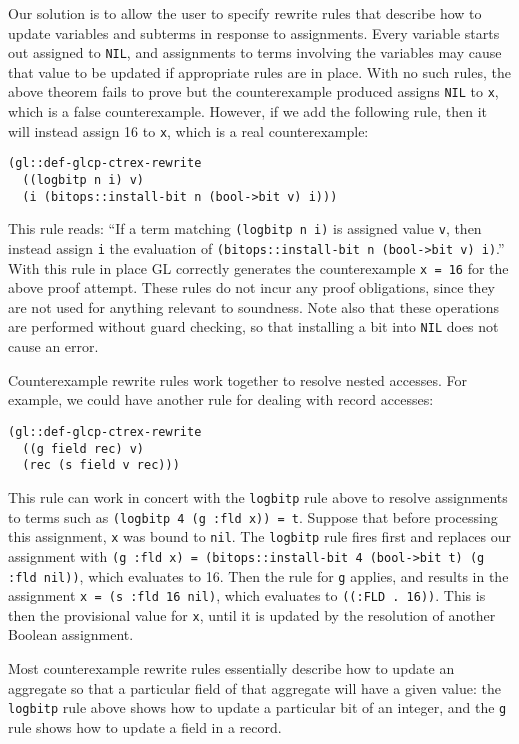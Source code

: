 \documentclass[submission,copyright,creativecommons]{eptcs}
\begin{document}
Our solution is to allow the user to specify rewrite rules that
describe how to update variables and subterms in response to
assignments.  Every variable starts out assigned to \texttt{NIL}, and
assignments to terms involving the variables may cause that value to
be updated if appropriate rules are in place.  With no such rules, the
above theorem fails to prove but the counterexample produced assigns
\texttt{NIL} to \texttt{x}, which is a false counterexample.  However,
if we add the following rule, then it will instead assign 16 to
\texttt{x}, which is a real counterexample:
\begin{verbatim}
(gl::def-glcp-ctrex-rewrite
  ((logbitp n i) v)
  (i (bitops::install-bit n (bool->bit v) i)))
\end{verbatim}
This rule reads: ``If a term matching \texttt{(logbitp n i)} is
assigned value \texttt{v}, then instead assign \texttt{i} the
evaluation of \texttt{(bitops::install-bit n (bool->bit v) i)}.''  With
this rule in place GL correctly generates the counterexample \texttt{x
  = 16} for the above proof attempt.  These rules do not incur any
proof obligations, since they are not used for anything relevant to
soundness.  Note also that these operations are performed without 
guard checking, so that installing a bit into \texttt{NIL} does not 
cause an error.

Counterexample rewrite rules work together to resolve nested accesses.
For example, we could have another rule for dealing with record accesses:
\begin{verbatim}
(gl::def-glcp-ctrex-rewrite
  ((g field rec) v)
  (rec (s field v rec)))
\end{verbatim}
\noindent This rule can work in concert with the \texttt{logbitp} rule
above to resolve assignments to terms such as \texttt{(logbitp 4 (g
  :fld x)) = t}.  Suppose that before processing this assignment, \texttt{x} was bound to \texttt{nil}.
The \texttt{logbitp} rule fires
first and replaces our assignment with \texttt{(g :fld x) =
  (bitops::install-bit 4 (bool->bit t) (g :fld nil))}, which evaluates
to 16.  Then the rule for \texttt{g} applies, and results in the
assignment \texttt{x = (s :fld 16 nil)}, which evaluates to
\texttt{((:FLD . 16))}.  This is then the provisional value for
\texttt{x}, until it is updated by the resolution of another Boolean assignment.

Most counterexample rewrite rules essentially describe how to update
an aggregate so that a particular field of that aggregate will have a
given value: the \texttt{logbitp} rule above shows how to update a
particular bit of an integer, and the \texttt{g} rule shows how to
update a field in a record.  
\end{document}
